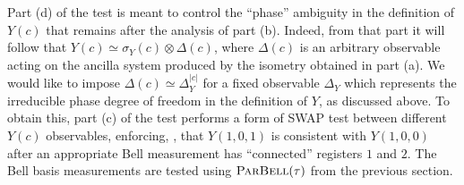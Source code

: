\documentclass{toc}
\newcommand{\pbellt}{\textsc{ParBell}}
\begin{document}
Part (d) of the test is meant to control the ``phase'' ambiguity in the definition of $Y(c)$ that remains after the analysis of part (b). Indeed, from that part it will follow that $Y(c) \simeq \sigma_Y(c) \otimes \Delta(c)$, where $\Delta(c)$ is an arbitrary observable acting on the ancilla system produced by the isometry obtained in part (a). We would like to impose $\Delta(c) \simeq \Delta_Y^{|c|}$ for a fixed observable $\Delta_Y$ which  represents the irreducible phase degree of freedom in the definition of $Y$, as discussed above. To obtain this, part (c) of the test performs a form of SWAP test between different $Y(c)$ observables, %
enforcing, \eg, that  %
$Y(1,0,1)$ is consistent with $Y(1,0,0)$ after an appropriate Bell measurement has ``connected'' registers $1$ and $2$. The Bell basis measurements are tested using $\pbellt(\tau)$ from the previous section. 
\end{document}

